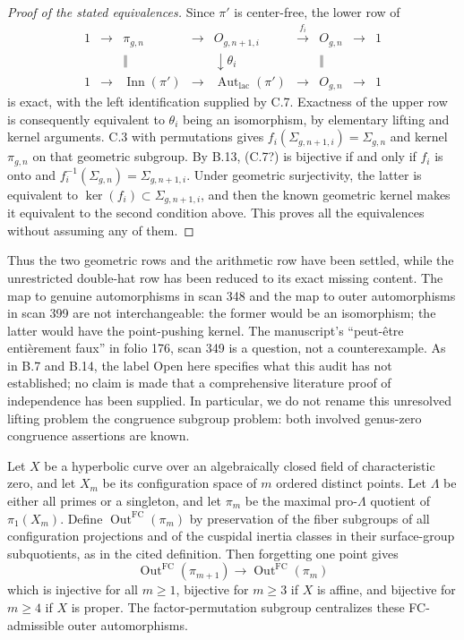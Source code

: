 \begin{proof}[Proof of the stated equivalences]
Since $\pi'$ is center-free, the lower row of
\[
\begin{array}{ccccccccc}
1&\to&\pi_{g,n}&\to&O_{g,n+1,i}&\xrightarrow{f_i}&O_{g,n}&\to&1\\
 &&\Vert&&\downarrow\theta_i&&\Vert\\
1&\to&\operatorname{Inn}(\pi')&\to&
\operatorname{Aut}_{\mathrm{lac}}(\pi')&\to&O_{g,n}&\to&1
\end{array}
\]
is exact, with the left identification supplied by C.7.
Exactness of the upper row is consequently equivalent to
$\theta_i$ being an isomorphism, by elementary lifting and
kernel arguments.  C.3 with permutations gives
$f_i(\Sigma_{g,n+1,i})=\Sigma_{g,n}$ and kernel
$\pi_{g,n}$ on that geometric subgroup.  By B.13, (C.7?) is
bijective if and only if $f_i$ is onto and
$f_i^{-1}(\Sigma_{g,n})=\Sigma_{g,n+1,i}$.  Under geometric
surjectivity, the latter is equivalent to
$\ker(f_i)\subset\Sigma_{g,n+1,i}$, and then the known
geometric kernel makes it equivalent to the second condition
above.  This proves all the equivalences without assuming any
of them.
\end{proof}

Thus the two geometric rows and the arithmetic row have been
settled, while the unrestricted double-hat row has been reduced
to its exact missing content.  The map to genuine automorphisms
in scan 348 and the map to outer automorphisms in scan 399 are
not interchangeable: the former would be an isomorphism; the
latter would have the point-pushing kernel.  The manuscript's
``peut-\^etre enti\`erement faux'' in folio 176, scan 349 is a
question, not a counterexample.  As in B.7 and B.14, the label
Open here specifies what this audit has not established; no
claim is made that a comprehensive literature proof of
independence has been supplied.  In particular, we do not
rename this unresolved lifting problem the congruence subgroup
problem: both involved genus-zero congruence assertions are known.

Let $X$ be a hyperbolic curve over an algebraically closed field
of characteristic zero, and let $X_m$ be its configuration space
of $m$ ordered distinct points.  Let $\Lambda$ be either all
primes or a singleton, and let $\pi_m$ be the maximal pro-$\Lambda$
quotient of $\pi_1(X_m)$.  Define
$\operatorname{Out}^{\mathrm{FC}}(\pi_m)$ by preservation of
the fiber subgroups of all configuration projections and of the
cuspidal inertia classes in their surface-group subquotients,
as in the cited definition.  Then forgetting one point gives
\[
 \operatorname{Out}^{\mathrm{FC}}(\pi_{m+1})
 \longrightarrow\operatorname{Out}^{\mathrm{FC}}(\pi_m)
\]
which is injective for all $m\geq1$, bijective for $m\geq3$ if
$X$ is affine, and bijective for $m\geq4$ if $X$ is proper.
The factor-permutation subgroup centralizes these FC-admissible
outer automorphisms.

